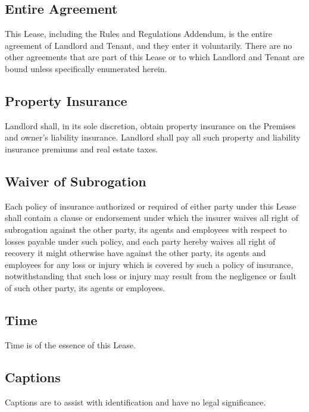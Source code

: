 \documentclass{article}
\begin{document}
\subsection{Entire Agreement}\label{Entire Agreement}
This Lease, including the Rules and Regulations Addendum, is the entire
agreement of Landlord and Tenant, and they enter it voluntarily. There are no
other agreements that are part of this Lease or to which Landlord and Tenant are
bound unless specifically enumerated herein.

\subsection{Property Insurance}
Landlord shall, in its sole discretion, obtain property insurance on the
Premises and owner’s liability insurance. Landlord shall pay all such property
and liability insurance premiums and real estate taxes.

\subsection{Waiver of Subrogation}
Each policy of insurance authorized or required of either party under this Lease
shall contain a clause or endorsement under which the insurer waives all right
of subrogation against the other party, its agents and employees with respect to
losses payable under such policy, and each party hereby waives all right of
recovery it might otherwise have against the other party, its agents and
employees for any loss or injury which is covered by such a policy of insurance,
notwithstanding that such loss or injury may result from the negligence or fault
of such other party, its agents or employees.

\subsection{Time}
Time is of the essence of this Lease.

\subsection{Captions}
Captions are to assist with identification and have no legal significance.

\end{document}
